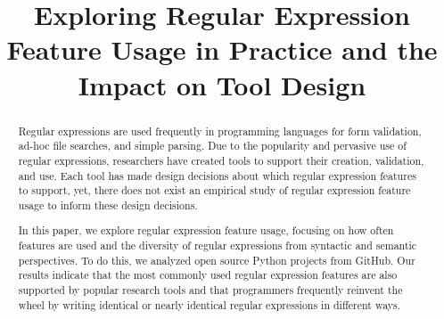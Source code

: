 \documentclass[conference]{IEEEtran}
\begin{document}
%
\title{Exploring Regular Expression Feature Usage in Practice and the Impact on Tool Design}

\author{
}

\maketitle


\begin{abstract}
Regular expressions are used frequently in programming languages for form validation, ad-hoc file searches, and simple parsing. Due to the popularity and pervasive use of regular expressions, researchers have created tools to support their creation, validation, and use. Each tool has made design decisions about which regular expression features to support, yet, there does not exist an empirical study of regular expression feature usage to inform these design decisions.

In this paper, we explore regular expression feature usage, focusing on how often features are used and the diversity of regular expressions from syntactic and semantic perspectives. To do this, we analyzed  open source Python projects from GitHub. Our results indicate that the most commonly used regular expression features are also supported by popular research tools and that programmers frequently reinvent the wheel by writing identical or nearly identical regular expressions in different ways.

\end{abstract}








\end{document}
